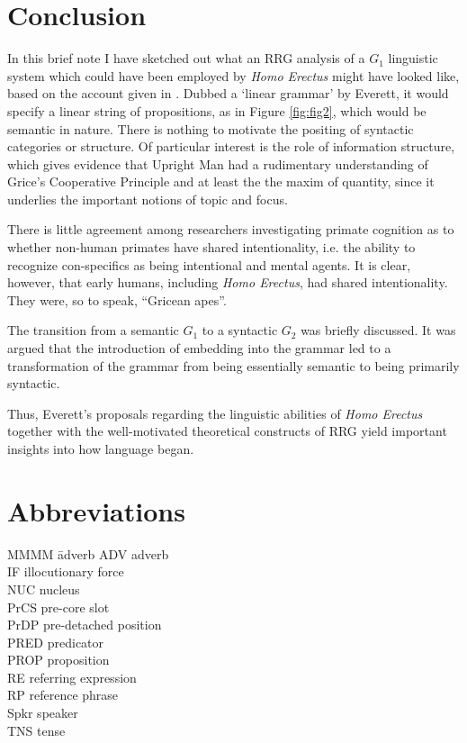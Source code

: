 \documentclass[output=paper,colorlinks,citecolor=brown]{langscibook}
\begin{document}
\section{Conclusion}\label{sec:vanvalin:6}
In this brief note I have sketched out what an RRG analysis of a $G_1$ linguistic system which could have been employed by \emph{Homo Erectus} might have looked like, based on the account given in \citet{everett2017language}.  Dubbed a ‘linear grammar’ by Everett, it would specify a linear string of propositions, as in Figure \ref{fig:fig2}, which would be semantic in nature.  There is nothing to motivate the positing of syntactic categories or structure.  Of particular interest is the role of information structure, which gives evidence that Upright Man had a rudimentary understanding of Grice’s Cooperative Principle and at least the the maxim of quantity, since it underlies the important notions of topic and focus.  

There is little agreement among researchers investigating primate cognition as to whether non-human primates have shared intentionality, i.e. the ability to recognize con-specifics as being intentional and mental agents.  It is clear, however, that early humans, including \emph{Homo Erectus}, had shared intentionality.  They were, so to speak, “Gricean apes”.

The transition from a semantic $G_1$ to a syntactic $G_2$ was briefly discussed.  It was argued that the introduction of embedding into the grammar led to a transformation of the grammar from being essentially semantic to being primarily syntactic.

Thus, Everett’s proposals regarding the linguistic abilities of \emph{Homo Erectus} together with the well-motivated theoretical constructs of RRG yield important insights into how language began.

\section*{Abbreviations}
\begin{multicols}{2}
\begin{tabbing}
MMMM \= adverb\kill
ADV  \> adverb\\ 
IF   \> illocutionary force\\ 
NUC  \> nucleus\\ 
PrCS \> pre-core slot\\ 
PrDP \> pre-detached position\\  
PRED \> predicator\\ 
PROP \> proposition\\ 
RE   \> referring expression\\ 
RP   \> reference phrase\\ 
Spkr \> speaker\\ 
TNS  \> tense
\end{tabbing}
\end{multicols}

\printbibliography[heading=subbibliography,notkeyword=this]
\end{document}
